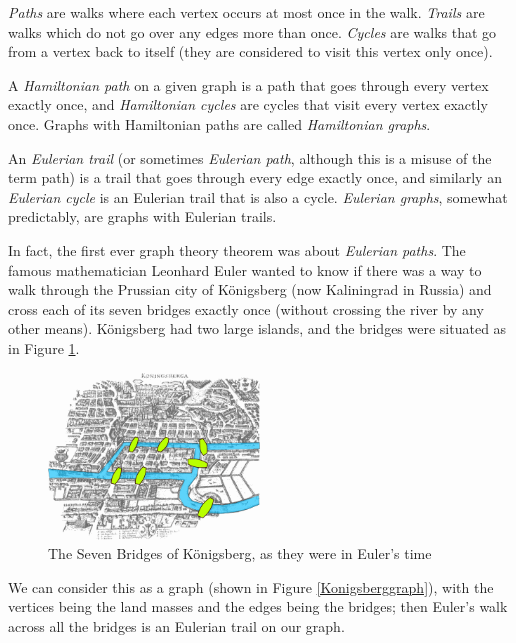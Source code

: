 	\textit{Paths} are walks where each vertex occurs at most once in the walk. \textit{Trails} are walks which do not go over any edges more than once. \textit{Cycles} are walks that go from a vertex back to itself (they are considered to visit this vertex only once).
	
	A \textit{Hamiltonian path} on a given graph is a path that goes through every vertex exactly once, and \textit{Hamiltonian cycles} are cycles that visit every vertex exactly once. Graphs with Hamiltonian paths are called \textit{Hamiltonian graphs}.
	
	An \textit{Eulerian trail} (or sometimes \textit{Eulerian path}, although this is a misuse of the term path) is a trail that goes through every edge exactly once, and similarly an \textit{Eulerian cycle} is an Eulerian trail that is also a cycle. \textit{Eulerian graphs}, somewhat predictably, are graphs with Eulerian trails.
	
	In fact, the first ever graph theory theorem was about \textit{Eulerian paths}. The famous mathematician Leonhard Euler wanted to know if there was a way to walk through the Prussian city of K\"onigsberg (now Kaliningrad in Russia) and cross each of its seven bridges exactly once (without crossing the river by any other means). K\"onigsberg had two large islands, and the bridges were situated as in Figure \ref{Konigsberg}.
	
	\begin{figure}[h]
		\centering
		\includegraphics[width=0.5\textwidth]{Konigsberg}
		\caption{The Seven Bridges of K\"onigsberg, as they were in Euler's time}
		\label{Konigsberg}
	\end{figure}
	
	We can consider this as a graph (shown in Figure \ref{Konigsberggraph}), with the vertices being the land masses and the edges being the bridges; then Euler's walk across all the bridges is an Eulerian trail on our graph.
	
